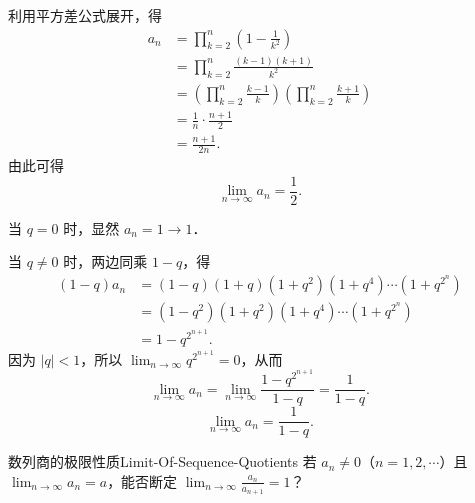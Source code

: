 \begin{solution}

    利用平方差公式展开，得
    \begin{equation}
        \begin{aligned}
            a_n & = \prod_{k=2}^n \left( 1 - \frac{1}{k^2} \right)                                        \\
                & = \prod_{k=2}^n \frac{(k-1)(k+1)}{k^2}                                                  \\
                & = \left( \prod_{k=2}^n \frac{k-1}{k} \right) \left( \prod_{k=2}^n \frac{k+1}{k} \right) \\
                & = \frac{1}{n} \cdot \frac{n+1}{2}                                                       \\
                & = \frac{n+1}{2n}.
        \end{aligned}
    \end{equation}
    由此可得
    \begin{equation}
        \boxed{\lim_{n\to\infty} a_n = \frac{1}{2}.}
    \end{equation}


    当 $q = 0$ 时，显然 $a_n = 1 \to 1$．

    当 $q \neq 0$ 时，两边同乘 $1 - q$，得
    \begin{equation}
        \begin{aligned}
            (1 - q) a_n & = (1 - q)(1 + q)(1 + q^2)(1 + q^4)\cdots(1 + q^{2^n}) \\
                        & = (1 - q^2)(1 + q^2)(1 + q^4)\cdots(1 + q^{2^n})      \\
                        & = 1 - q^{2^{n+1}}.
        \end{aligned}
    \end{equation}
    因为 $|q| < 1$，所以 $\lim_{n\to\infty} q^{2^{n+1}} = 0$，从而
    \begin{equation}
        \lim_{n\to\infty} a_n = \lim_{n\to\infty} \frac{1 - q^{2^{n+1}}}{1 - q} = \frac{1}{1 - q}.
    \end{equation}
    \begin{equation}
        \boxed{\lim_{n\to\infty} a_n = \frac{1}{1 - q}.}
    \end{equation}
\end{solution}

\begin{problem}{数列商的极限性质}{Limit-Of-Sequence-Quotients}
    若 $a_n \neq 0$（$n = 1, 2, \cdots$）且 $\lim_{n\to\infty} a_n = a$，能否断定 $\lim_{n\to\infty} \frac{a_n}{a_{n+1}} = 1$？
\end{problem}

